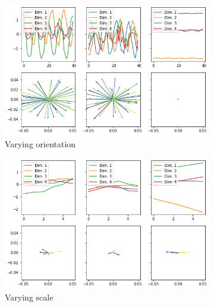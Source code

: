 \begin{figure}
\begin{subfigure}{.48\textwidth}
        \centering
        \includegraphics[width=\textwidth]{images/latent_space_traversals/vlae_dsprites_orientation_latent_space_values.png}
        \caption{Varying orientation}
        \label{subfig:vlae_dsprites_latent_space_values_orientation}
    \end{subfigure}
    \hfill
    \begin{subfigure}{.48\textwidth}
        \centering
        \includegraphics[width=\textwidth]{images/latent_space_traversals/vlae_dsprites_scale_latent_space_values.png}
        \caption{Varying scale}
        \label{subfig:vlae_dsprites_latent_space_values_scale}
    \end{subfigure}
    \vfill
    \begin{subfigure}{.48\textwidth}
        \centering

\end{subfigure}
\end{figure}
